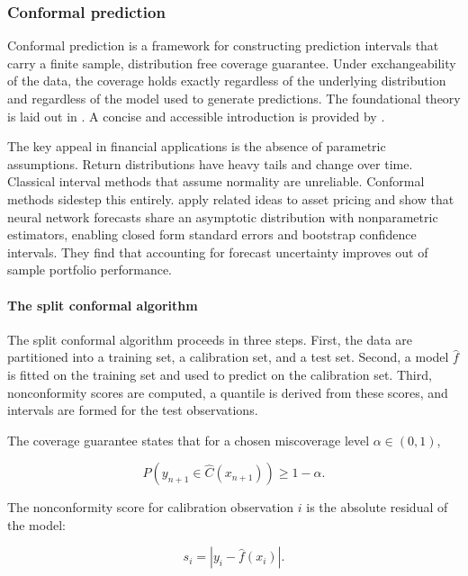 \subsubsection{Conformal prediction}\label{sec_conformal}

Conformal prediction is a framework for constructing prediction intervals that carry a finite sample, distribution free coverage guarantee. Under exchangeability of the data, the coverage holds exactly regardless of the underlying distribution and regardless of the model used to generate predictions. The foundational theory is laid out in \cite{vovk2005algorithmic}. A concise and accessible introduction is provided by \cite{angelopoulos2023gentle}.

The key appeal in financial applications is the absence of parametric assumptions. Return distributions have heavy tails and change over time. Classical interval methods that assume normality are unreliable. Conformal methods sidestep this entirely. \cite{liao2025uncertainty} apply related ideas to asset pricing and show that neural network forecasts share an asymptotic distribution with nonparametric estimators, enabling closed form standard errors and bootstrap confidence intervals. They find that accounting for forecast uncertainty improves out of sample portfolio performance.

\paragraph{The split conformal algorithm}

The split conformal algorithm proceeds in three steps. First, the data are partitioned into a training set, a calibration set, and a test set. Second, a model $\hat{f}$ is fitted on the training set and used to predict on the calibration set. Third, nonconformity scores are computed, a quantile is derived from these scores, and intervals are formed for the test observations.

The coverage guarantee states that for a chosen miscoverage level $\alpha \in (0,1)$,

\begin{equation}
\label{eq_conformal_coverage}
P(y_{n+1} \in \hat{C}(x_{n+1})) \geq 1 - \alpha.
\end{equation}

The nonconformity score for calibration observation $i$ is the absolute residual of the model:

\begin{equation}
\label{eq_nonconformity}
s_i = |y_i - \hat{f}(x_i)|.
\end{equation}

